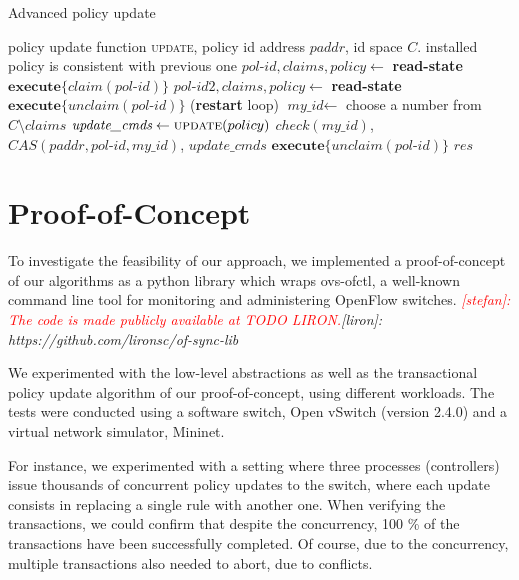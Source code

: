 \documentclass[conference]{sigcomm-alternate}
\newcommand{\claimcheck}{check\xspace}
\newcommand{\paddr}{\textit{paddr}\xspace}
\newcommand{\pid}{\textit{pol-id}\xspace}
\newcommand{\ufunc}{update} %
\newcommand{\stefan}[1]{\textit{\textcolor{red}{[stefan]: #1}}} %
\newcommand{\liron}[1]{\textit{\textcolor{mypurple}{[liron]: #1}}} %
\newcommand{\ack}{\textit{ack}}
\begin{document}
{\small
\begin{algorithm}[t]
    \caption{Advanced policy update}
    \label{alg:update}
    \begin{algorithmic}[1]
        \Require policy update function \textsc{\ufunc}, policy id address $\paddr$, id space $C$.
    \Ensure installed policy is consistent with previous one
 		\Repeat
		 	\State $\pid,claims,policy\gets$ \textbf{read-state} \label{update:read-state1} %
 			\State $\textbf{execute}\{claim(\pid)\}$
 			\State $\pid 2,\textit{claims},\textit{policy}\gets$ \textbf{read-state} \label{update:read-state2} %
 			\If {$\pid\neq \pid 2$}
	 			\State $\textbf{execute} \{\textit{unclaim}(\pid)\}$
 				 (\textbf{restart} loop)
 			\EndIf
 			\State $\textit{my\_id}\gets$ choose a number from $C\setminus claims$
 			\State $\textit{update\_cmds}\gets \textsc{\ufunc}(policy)$ \label{update:compute}
 			\startTxn
 				\State $\claimcheck(my\_id)$,
	 			\State $CAS(\paddr, \pid,my\_id)$,
	 			\State $\textit{update\_cmds}$ %
 			\endTxn
	 		\State $\textbf{execute} \{\textit{unclaim}(\pid)\}$
     	\Until{$res=\ack$}
			\Return $\textit{res}$

    \end{algorithmic}
\end{algorithm}
}


\section{Proof-of-Concept}

To investigate the feasibility of our approach,
we implemented a proof-of-concept of our algorithms
as a python library which wraps ovs-ofctl, 
a well-known command line tool for monitoring and administering OpenFlow switches. 
\stefan{The code is made publicly available at TODO LIRON.}\liron{https://github.com/lironsc/of-sync-lib}

We experimented with the low-level abstractions as well as the 
transactional policy update algorithm of our proof-of-concept, using
different workloads. 
The tests were conducted using a software switch, Open vSwitch (version 2.4.0) and
a virtual network simulator, Mininet.

For instance, we experimented with a setting where three processes
(controllers) issue thousands of concurrent policy updates
to the switch, where 
each update consists in replacing a single rule with another one.
When verifying the transactions, we could confirm that 
despite the concurrency, 100 \% of the transactions have been successfully completed.
Of course, due to the concurrency, multiple transactions also needed to abort,
due to conflicts. 
 
\end{document}
